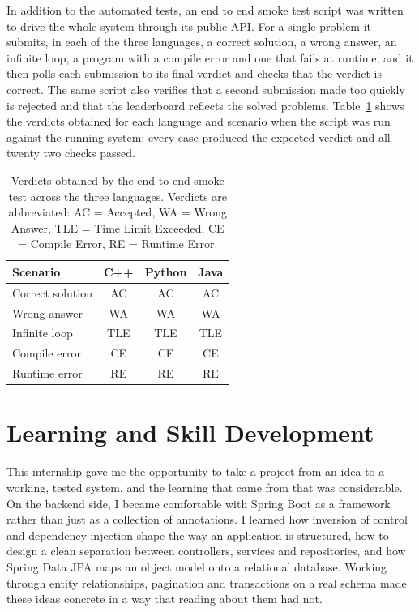 \documentclass[12pt,a4paper]{report}
\begin{document}
In addition to the automated tests, an end to end smoke test script was written to drive the whole system through its public API. For a single problem it submits, in each of the three languages, a correct solution, a wrong answer, an infinite loop, a program with a compile error and one that fails at runtime, and it then polls each submission to its final verdict and checks that the verdict is correct. The same script also verifies that a second submission made too quickly is rejected and that the leaderboard reflects the solved problems. Table~\ref{tab:smoke} shows the verdicts obtained for each language and scenario when the script was run against the running system; every case produced the expected verdict and all twenty two checks passed.

\begin{table}[htbp]
  \centering
  \caption{Verdicts obtained by the end to end smoke test across the three languages.
  Verdicts are abbreviated: AC = Accepted, WA = Wrong Answer, TLE = Time Limit Exceeded,
  CE = Compile Error, RE = Runtime Error.}
  \label{tab:smoke}
  \begin{tabular}{|l|c|c|c|}
    \hline
    \textbf{Scenario} & \textbf{C++} & \textbf{Python} & \textbf{Java} \\
    \hline
    Correct solution & AC  & AC  & AC  \\
    \hline
    Wrong answer     & WA  & WA  & WA  \\
    \hline
    Infinite loop    & TLE & TLE & TLE \\
    \hline
    Compile error    & CE  & CE  & CE  \\
    \hline
    Runtime error    & RE  & RE  & RE  \\
    \hline
  \end{tabular}
\end{table}

\chapter*{Learning and Skill Development}

This internship gave me the opportunity to take a project from an idea to a working, tested system, and the learning that came from that was considerable. On the backend side, I became comfortable with Spring Boot as a framework rather than just as a collection of annotations. I learned how inversion of control and dependency injection shape the way an application is structured, how to design a clean separation between controllers, services and repositories, and how Spring Data JPA maps an object model onto a relational database. Working through entity relationships, pagination and transactions on a real schema made these ideas concrete in a way that reading about them had not.
\end{document}

